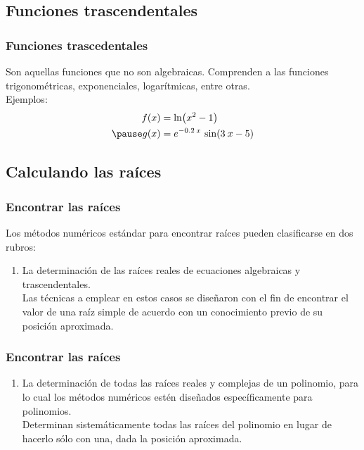 \documentclass[12pt]{beamer}
\begin{document}
\subsection{Funciones trascendentales}

\begin{frame}
\frametitle{Funciones trascedentales}
Son aquellas funciones que no son algebraicas. \pause Comprenden a las funciones trigonométricas, exponenciales, logarítmicas, entre otras.
\\
\bigskip
\pause
Ejemplos:
\begin{eqnarray*}
\begin{aligned}
f (x) &= \ln(x^{2} - 1) \\ \pause
g (x) &= e^{-0.2 \: x} \, \sin(3 \: x - 5)
\end{aligned}
\end{eqnarray*}
\end{frame}

\subsection{Calculando las raíces}

\begin{frame}
\frametitle{Encontrar las raíces}
Los métodos numéricos estándar para encontrar raíces pueden clasificarse en dos rubros:
\pause
{}
\begin{enumerate}[<+->]
\item La determinación de las raíces reales de ecuaciones algebraicas y trascendentales.
\\
\bigskip
\pause
Las técnicas a emplear en estos casos se diseñaron con el fin de encontrar el valor de una raíz simple de acuerdo con un conocimiento previo de su posición aproximada.
\seti
\end{enumerate}
\end{frame}
\begin{frame}
\frametitle{Encontrar las raíces}
\begin{enumerate}[<+->]
\conti    
\item La determinación de todas las raíces reales y complejas de un polinomio, para lo cual los métodos numéricos estén diseñados específicamente para polinomios. 
\\
\bigskip
\pause
Determinan sistemáticamente todas las raíces del polinomio en lugar de hacerlo sólo con una, dada la posición aproximada.
\end{enumerate}
\end{frame}
\end{document}
